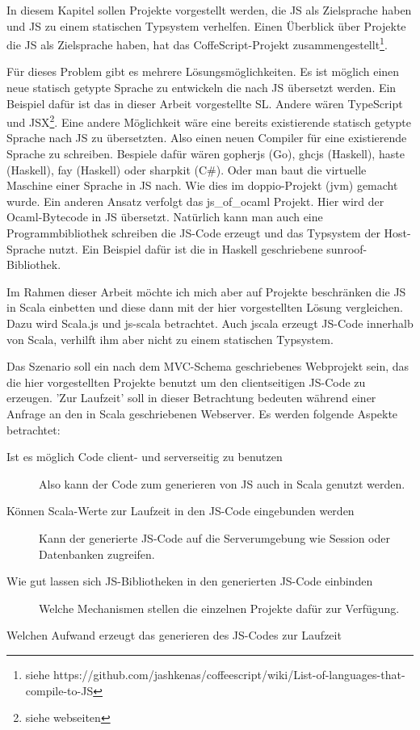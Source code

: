 \documentclass[12pt,bibtotoc]{scrreprt}
\begin{document}
In diesem Kapitel sollen Projekte vorgestellt werden, die JS als Zielsprache haben und JS zu einem statischen Typsystem verhelfen. Einen Überblick über Projekte die JS als Zielsprache haben, hat das CoffeScript-Projekt zusammengestellt\footnote{siehe https://github.com/jashkenas/coffeescript/wiki/List-of-languages-that-compile-to-JS}. 

Für dieses Problem gibt es mehrere Lösungsmöglichkeiten. Es ist möglich einen neue statisch getypte Sprache zu entwickeln die nach JS übersetzt werden. Ein Beispiel dafür ist das in dieser Arbeit vorgestellte SL. Andere wären TypeScript und JSX\footnote{siehe webseiten}. Eine andere Möglichkeit wäre eine bereits existierende statisch getypte Sprache nach JS zu übersetzten. Also einen neuen Compiler für eine existierende Sprache zu schreiben. Bespiele dafür wären gopherjs (Go), ghcjs (Haskell), haste (Haskell), fay (Haskell) oder sharpkit (C\#). Oder man baut die virtuelle Maschine einer Sprache in JS nach. Wie dies im doppio-Projekt (jvm) gemacht wurde. Ein anderen Ansatz verfolgt das js\_of\_ocaml Projekt. Hier wird der Ocaml-Bytecode in JS übersetzt. Natürlich kann man auch eine Programmbibliothek schreiben die JS-Code erzeugt und das Typsystem der Host-Sprache nutzt. Ein Beispiel dafür ist die in Haskell geschriebene sunroof-Bibliothek. 

Im Rahmen dieser Arbeit möchte ich mich aber auf Projekte beschränken die JS in Scala einbetten und diese dann mit der hier vorgestellten Lösung vergleichen. Dazu wird Scala.js und js-scala betrachtet. Auch jscala erzeugt JS-Code innerhalb von Scala, verhilft ihm aber nicht zu einem statischen Typsystem.

Das Szenario soll ein nach dem MVC-Schema geschriebenes Webprojekt sein, das die hier vorgestellten Projekte benutzt um den clientseitigen JS-Code zu erzeugen. 'Zur Laufzeit' soll in dieser Betrachtung bedeuten während einer Anfrage an den in Scala geschriebenen Webserver. Es werden folgende Aspekte betrachtet:

\begin{description}
 \item[Ist es möglich Code client- und serverseitig zu benutzen] Also kann der Code zum generieren von JS auch in Scala genutzt werden.
 \item[Können Scala-Werte zur Laufzeit in den JS-Code eingebunden werden] Kann der generierte JS-Code auf die Serverumgebung wie Session oder Datenbanken zugreifen.
 \item[Wie gut lassen sich JS-Bibliotheken in den generierten JS-Code einbinden] Welche Mechanismen stellen die einzelnen Projekte dafür zur Verfügung.
 \item[Welchen Aufwand erzeugt das generieren des JS-Codes zur Laufzeit]
\end{description}
\end{document}
